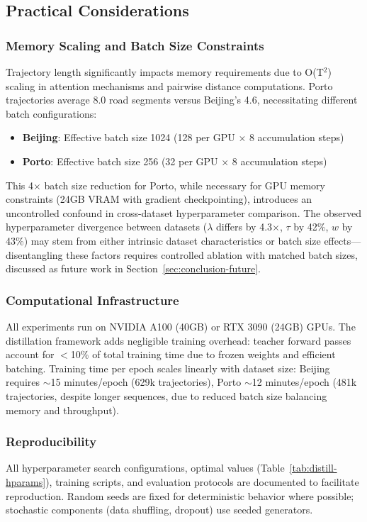 \subsection{Practical Considerations}
\label{sec:impl-practical}

\subsubsection{Memory Scaling and Batch Size Constraints}

Trajectory length significantly impacts memory requirements due to O(T$^2$) scaling in attention mechanisms and pairwise distance computations. Porto trajectories average 8.0 road segments versus Beijing's 4.6, necessitating different batch configurations:

\begin{itemize}[noitemsep,topsep=0pt]
    \item \textbf{Beijing}: Effective batch size 1024 (128 per GPU $\times$ 8 accumulation steps)
    \item \textbf{Porto}: Effective batch size 256 (32 per GPU $\times$ 8 accumulation steps)
\end{itemize}

This 4$\times$ batch size reduction for Porto, while necessary for GPU memory constraints (24GB VRAM with gradient checkpointing), introduces an uncontrolled confound in cross-dataset hyperparameter comparison. The observed hyperparameter divergence between datasets ($\lambda$ differs by 4.3$\times$, $\tau$ by 42\%, $w$ by 43\%) may stem from either intrinsic dataset characteristics or batch size effects---disentangling these factors requires controlled ablation with matched batch sizes, discussed as future work in Section~\ref{sec:conclusion-future}.

\subsubsection{Computational Infrastructure}

All experiments run on NVIDIA A100 (40GB) or RTX 3090 (24GB) GPUs. The distillation framework adds negligible training overhead: teacher forward passes account for $<$10\% of total training time due to frozen weights and efficient batching. Training time per epoch scales linearly with dataset size: Beijing requires $\sim$15 minutes/epoch (629k trajectories), Porto $\sim$12 minutes/epoch (481k trajectories, despite longer sequences, due to reduced batch size balancing memory and throughput).

\subsubsection{Reproducibility}

All hyperparameter search configurations, optimal values (Table~\ref{tab:distill-hparams}), training scripts, and evaluation protocols are documented to facilitate reproduction. Random seeds are fixed for deterministic behavior where possible; stochastic components (data shuffling, dropout) use seeded generators.

